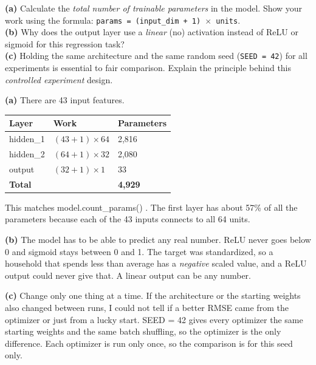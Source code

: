 \documentclass[12pt,a4paper]{article}
\begin{document}
\begin{tcolorbox}[colback=lightblue!40, colframe=myColorB, title={\textbf{3.1 — Architecture Analysis}}, fonttitle=\small\bfseries, breakable]
\textbf{(a)} Calculate the \emph{total number of trainable parameters} in the model.
Show your work using the formula: \texttt{params = (input\_dim + 1) $\times$ units}.\\[6pt]
\textbf{(b)} Why does the output layer use a \emph{linear} (no) activation instead of
ReLU or sigmoid for this regression task?\\[6pt]
\textbf{(c)} Holding the same architecture and the same random seed (\texttt{SEED = 42})
for all experiments is essential to fair comparison. Explain the principle behind this
\emph{controlled experiment} design.
\end{tcolorbox}

\begin{answerbox}
\textbf{(a)} There are 43 input features.

\begin{center}\small
\begin{tabular}{@{}lll@{}}
\toprule
Layer & Work & Parameters \\
\midrule
hidden\_1 & \((43+1)\times 64\) & 2,816 \\
hidden\_2 & \((64+1)\times 32\) & 2,080 \\
output & \((32+1)\times 1\) & 33 \\
\textbf{Total} & & \textbf{4,929} \\
\bottomrule
\end{tabular}
\end{center}

This matches model.count\_params() . The first layer has about 57\% of all the parameters because each of the 43 inputs connects to all 64 units.

\textbf{(b)} The model has to be able to predict any real number. ReLU never goes below 0 and sigmoid stays between 0 and 1. The target was standardized, so a household that spends less than average has a \emph{negative} scaled value, and a ReLU output could never give that. A linear output can be any number.

\textbf{(c)} Change only one thing at a time. If the architecture or the starting weights also changed between runs, I could not tell if a better RMSE came from the optimizer or just from a lucky start. SEED = 42 gives every optimizer the same starting weights and the same batch shuffling, so the optimizer is the only difference. Each optimizer is run only once, so the comparison is for this seed only.

\end{answerbox}
\end{document}
